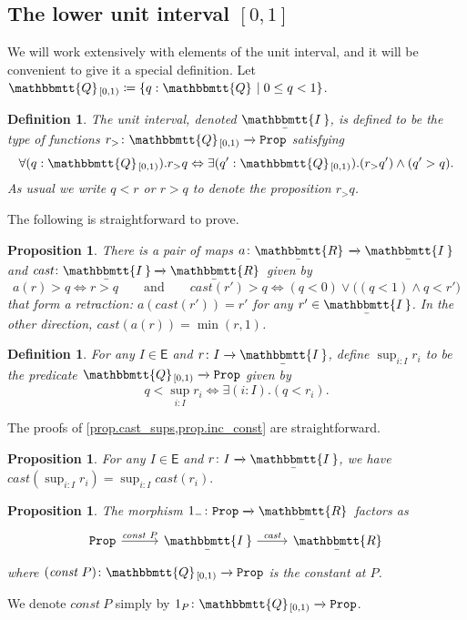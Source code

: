 \documentclass[reqno,11pt]{amsproc}
\theoremstyle{plain}
\newtheorem{proposition}[theorem]{Proposition}
\newtheorem{definition}[theorem]{Definition}
\theoremstyle{definition}
\newcommand{\Const}[1]{\mathtt{#1}}
\newcommand{\cat}[1]{\mathsf{#1}}
\renewcommand{\to}[1][]{\xrightarrow{#1}}
\newcommand{\ubar}[1]{\underaccent{\bar}{#1}}
\newcommand{\ind}[1]{1_{#1}}			%
\newcommand{\inc}{\ind{-}}			%
\newcommand{\internal}[1]{\raisebox{-.03ex}{$\mathbbmtt{#1}$}}
\newcommand{\hs}{\hspace{1pt}}
\newcommand{\tqq}{\internal{Q}\hs}
\newcommand{\tqqint}{\internal{Q}\hs_{[0,1)}}
\newcommand{\trr}{\internal{R}}
\newcommand{\tii}{\ubar{\internal{I\hs\hs}}\!\hs}
\newcommand{\tlrr}{\ubar{\trr}\hs}
\newcommand{\cast}{\textit{cast}}
\newcommand{\prop}{\Const{Prop}}
\renewcommand{\iff}{\Leftrightarrow}
\numberwithin{equation}{section}
\begin{document}
\subsection{The lower unit interval $[0,1]$}

We will work extensively with elements of the unit interval, and it will be convenient to give it a special definition. Let $\tqqint\coloneqq\{q:\tqq\mid 0\leq q< 1\}$.

\begin{definition}\label{def.unit_interval}
The \emph{unit interval}, denoted $\tii$, is defined to be the type of functions $r_>\colon\tqqint\to\prop$ satisfying
\begin{equation}\label{eqn.down_closed_rounded_for_interval}
	\forall(q:\tqqint).r_>q\iff\exists(q':\tqqint).(r_>q')\wedge (q'>q).
\end{equation}
As usual we write $q<r$ or $r>q$ to denote the proposition $r_>q$.
\end{definition}

The following is straightforward to prove.
\begin{proposition}\label{prop.unit_interval_cast}
There is a pair of maps $a\colon\tlrr\to\tii$ and $\cast\colon\tii\to\tlrr$ given by
\[
a(r)>q\iff r>q
\qquad\textrm{and}\qquad
\cast(r')>q\iff (q<0)\vee\big((q<1)\wedge q<r'\big)
\]
that form a retraction: $a(\cast(r'))=r'$ for any $r'\in\tii$. In the other direction, $\cast(a(r))=\min(r,1)$.
\end{proposition}

\begin{definition}\label{def.sup_unit_interval}
For any $I\in\cat{E}$ and $r\colon I\to\tii$, define $\sup_{i:I}r_i$ to be the predicate $\tqqint\to\prop$ given by
\[
q<\sup_{i:I}r_i\iff \exists(i:I).(q<r_i).
\]
\end{definition}

The proofs of \cref{prop.cast_sups,prop.inc_const} are straightforward.
\begin{proposition}\label{prop.cast_sups}
For any $I\in\cat{E}$ and $r\colon I\to\tii$, we have $\cast(\sup_{i:I}r_i)=\sup_{i:I}\cast(r_i).$
\end{proposition}

\begin{proposition}\label{prop.inc_const}
The morphism $\inc\colon\prop\to\tlrr$ factors as
\[
\begin{tikzcd}
	\prop\ar[r, "\textit{const}\ P"]&[5pt]
	\tii\ar[r, "\cast"]&
	\tlrr
\end{tikzcd}
\]
where $(\textit{const}\ P)\colon\tqqint\to\prop$ is the constant at $P$.
\end{proposition}
We denote $\textit{const}\ P$ simply by $\ind{P}\colon\tqqint\to\prop$.
\end{document}
